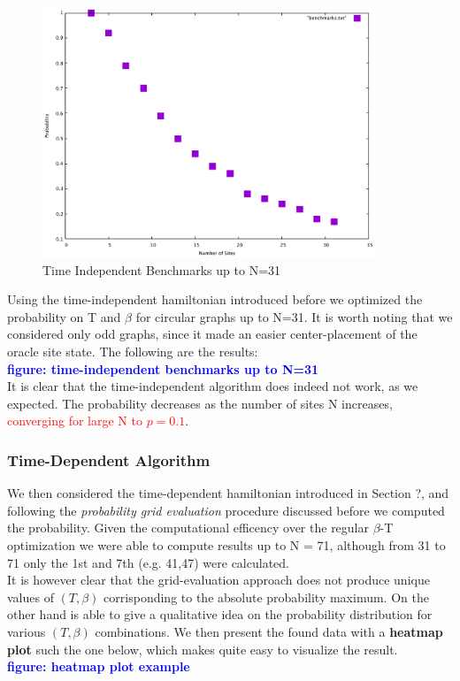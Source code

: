 \documentclass[aps,pra,reprint, onecolumn, showkeys]{revtex4-2}
\newcommand{\red}[1]{\textcolor{red}{#1}}
\newcommand{\blue}[1]{\textcolor{blue}{\textbf{figure: #1}}}
\begin{document}
\begin{figure}[ht]
\includegraphics[width=10cm]{./figures/benchmarks.pdf}%
\caption{Time Independent Benchmarks up to N=31}
\end{figure}



Using the time-independent hamiltonian introduced before we optimized the probability on T and $\beta$ for circular graphs up to N=31. It is worth noting that we considered only odd graphs, since it made an easier center-placement of the oracle site state. The following are the results:\\
\blue{time-independent benchmarks up to N=31}\\
It is clear that the time-independent algorithm does indeed not work, as we expected. The probability decreases as the number of sites N increases, \red{converging for large N to $p=0.1$}.

\subsubsection{Time-Dependent Algorithm}
We then considered the time-dependent hamiltonian introduced in Section ?, and following the \textit{probability grid evaluation} procedure discussed before we computed the probability. Given the computational efficency over the regular $\beta$-T optimization we were able to compute results up to N = 71, although from 31 to 71 only the 1st and 7th (e.g. 41,47) were calculated. \\

It is however clear that the grid-evaluation approach does not produce unique values of $(T,\beta)$ corrisponding to the absolute probability maximum. On the other hand is able to give a qualitative idea on the probability distribution for various $(T,\beta)$ combinations. We then present the found data with a \textbf{heatmap plot} such the one below, which makes quite easy to visualize the result.\\ \blue{heatmap plot example}\\
\end{document}
